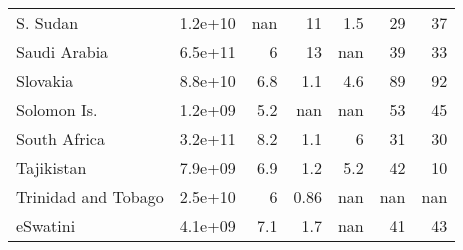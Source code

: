 \begin{table}
\begin{tabular}{lrrrrrr}
        S. Sudan            & 1.2e+10 & nan    & 11       & 1.5       & 29  & 37  \\
        Saudi Arabia        & 6.5e+11 & 6      & 13       & nan       & 39  & 33  \\
        Slovakia            & 8.8e+10 & 6.8    & 1.1      & 4.6       & 89  & 92  \\
        Solomon Is.         & 1.2e+09 & 5.2    & nan      & nan       & 53  & 45  \\
        South Africa        & 3.2e+11 & 8.2    & 1.1      & 6         & 31  & 30  \\
        Tajikistan          & 7.9e+09 & 6.9    & 1.2      & 5.2       & 42  & 10  \\
        Trinidad and Tobago & 2.5e+10 & 6      & 0.86     & nan       & nan & nan \\
        eSwatini            & 4.1e+09 & 7.1    & 1.7      & nan       & 41  & 43  \\
        \bottomrule
    \end{tabular}
\end{table}
